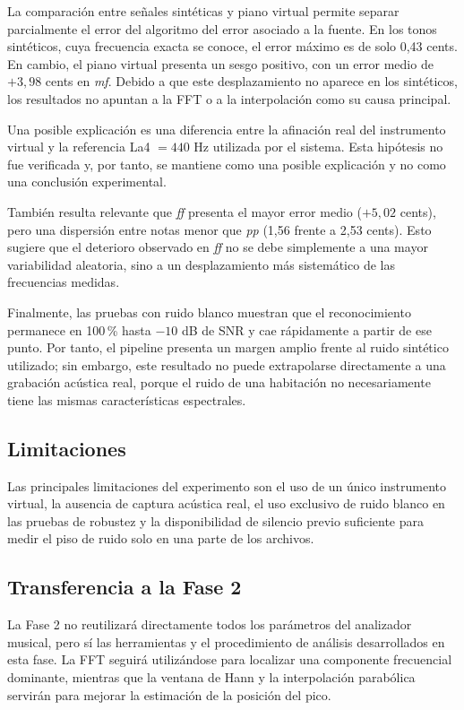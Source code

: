 \documentclass[12pt]{article}
\begin{document}
La comparación entre señales sintéticas y piano virtual permite separar parcialmente
el error del algoritmo del error asociado a la fuente. En los tonos sintéticos, cuya
frecuencia exacta se conoce, el error máximo es de solo 0,43 cents. En cambio, el
piano virtual presenta un sesgo positivo, con un error medio de $+3{,}98$ cents en
\emph{mf}. Debido a que este desplazamiento no aparece en los sintéticos, los
resultados no apuntan a la FFT o a la interpolación como su causa principal.

Una posible explicación es una diferencia entre la afinación real del instrumento
virtual y la referencia La4 $=440$ Hz utilizada por el sistema. Esta hipótesis no fue
verificada y, por tanto, se mantiene como una posible explicación y no como una
conclusión experimental.

También resulta relevante que \emph{ff} presenta el mayor error medio
($+5{,}02$ cents), pero una dispersión entre notas menor que \emph{pp}
(1,56 frente a 2,53 cents). Esto sugiere que el deterioro observado en \emph{ff}
no se debe simplemente a una mayor variabilidad aleatoria, sino a un desplazamiento
más sistemático de las frecuencias medidas.

Finalmente, las pruebas con ruido blanco muestran que el reconocimiento permanece
en 100\,\% hasta $-10$ dB de SNR y cae rápidamente a partir de ese punto. Por tanto,
el pipeline presenta un margen amplio frente al ruido sintético utilizado; sin embargo,
este resultado no puede extrapolarse directamente a una grabación acústica real,
porque el ruido de una habitación no necesariamente tiene las mismas características
espectrales.
\subsection{Limitaciones}

Las principales limitaciones del experimento son el uso de un único instrumento
virtual, la ausencia de captura acústica real, el uso exclusivo de ruido blanco en
las pruebas de robustez y la disponibilidad de silencio previo suficiente para medir
el piso de ruido solo en una parte de los archivos.
\subsection{Transferencia a la Fase 2}

La Fase 2 no reutilizará directamente todos los parámetros del analizador musical,
pero sí las herramientas y el procedimiento de análisis desarrollados en esta fase.
La FFT seguirá utilizándose para localizar una componente frecuencial dominante,
mientras que la ventana de Hann y la interpolación parabólica servirán para mejorar
la estimación de la posición del pico.
\end{document}
